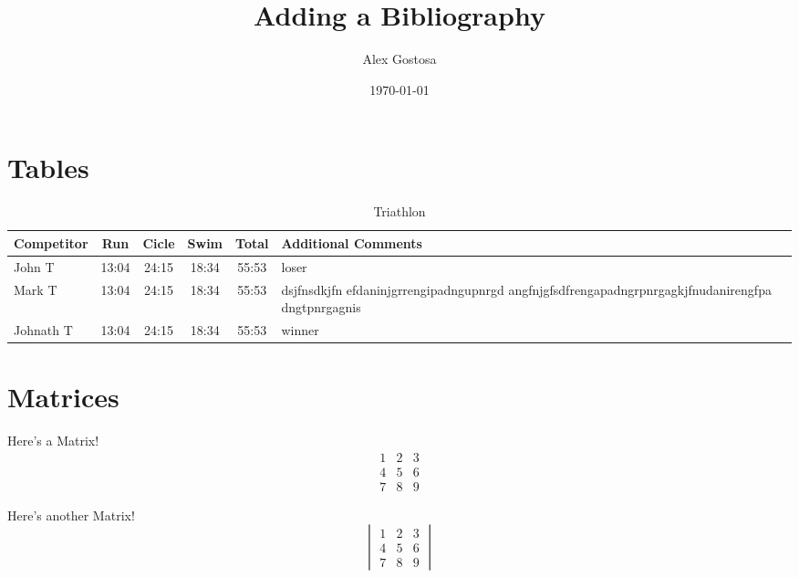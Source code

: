 \documentclass{article}
\title{Adding a Bibliography}
\author{Alex Gostosa}
\date{\today}
\begin{document}
\section{Tables}

\begin{table}[h]
\begin{tabular}{l | c | c | c | c | p{5cm}}

    Competitor & Run & Cicle & Swim & Total & Additional Comments\\
    \hline \hline
    John T & 13:04 & 24:15 & 18:34 & 55:53 & loser\\
    Mark T & 13:04 & 24:15 & 18:34 & 55:53 & dsjfnsdkjfn efdaninjgrrengipadngupnrgd angfnjgfsdfrengapadngrpnrgagkjfnudanirengfpa dngtpnrgagnis\\
    Johnath T & 13:04 & 24:15 & 18:34 & 55:53 & winner\\
         
\end{tabular}
\caption{Triathlon}
\label{tab:tri}
\end{table}


\section{Matrices}

Here's a Matrix!
\[
\begin{matrix}
1 & 2 & 3\\
4 & 5 & 6\\
7 & 8 & 9
\end{matrix}
\]

Here's another Matrix!
\[
\begin{vmatrix}
1 & 2 & 3\\
4 & 5 & 6\\
7 & 8 & 9
\end{vmatrix}
\]
\end{document}
